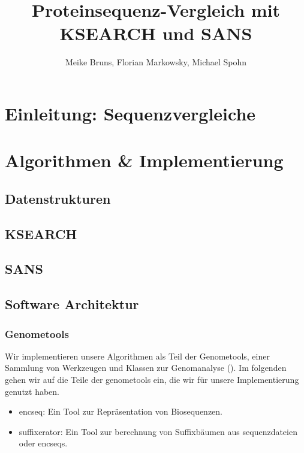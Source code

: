 \documentclass{article}
\title{Proteinsequenz-Vergleich mit KSEARCH und SANS}
\author{Meike Bruns, Florian Markowsky, Michael Spohn}
\begin{document}
\maketitle
\thispagestyle{empty}
\begin{abstract}
\end{abstract}
\newpage

\tableofcontents
\thispagestyle{empty}
\newpage

\section{Einleitung: Sequenzvergleiche}

\section{Algorithmen \& Implementierung}

\subsection{Datenstrukturen}

\subsection{KSEARCH}
\label{ksearch}

\subsection{SANS}
\label{sans}

\subsection{Software Architektur}

\subsubsection{Genometools}

Wir implementieren unsere Algorithmen als Teil der Genometools, einer Sammlung von Werkzeugen und Klassen zur Genomanalyse (\cite{gtools}).
Im folgenden gehen wir auf die Teile der genometools ein, die wir für unsere Implementierung genutzt haben.
\begin{itemize}
  \item encseq: Ein Tool zur Repräsentation von Biosequenzen.
  \item suffixerator: Ein Tool zur berechnung von Suffixbäumen aus sequenzdateien oder encseqs.
\end{itemize}
\end{document}

